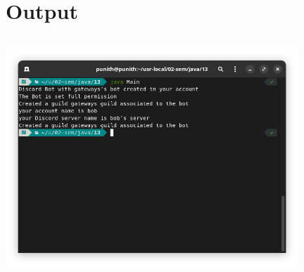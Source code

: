\documentclass{article}
\begin{document}
\section*{Output}
\includegraphics[width=11cm, height=9cm]{./images/01.png}
\end{document}
